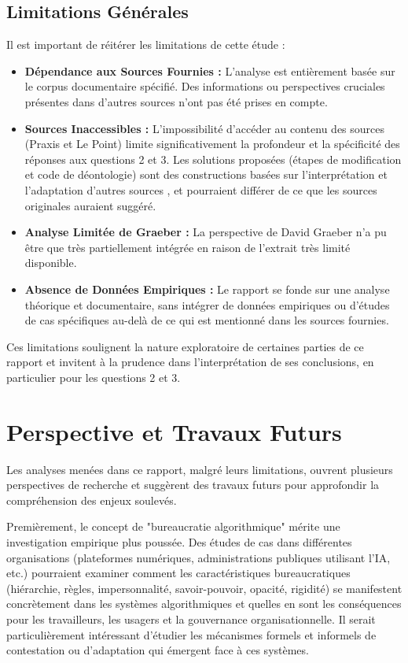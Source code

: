 \documentclass[10pt, twocolumn]{article}
\begin{document}
\subsection{Limitations Générales}

Il est important de réitérer les limitations de cette étude :
\begin{itemize}
    \item \textbf{Dépendance aux Sources Fournies :} L'analyse est entièrement basée sur le corpus documentaire spécifié. Des informations ou perspectives cruciales présentes dans d'autres sources n'ont pas été prises en compte.
    \item \textbf{Sources Inaccessibles :} L'impossibilité d'accéder au contenu des sources (Praxis et Le Point) limite significativement la profondeur et la spécificité des réponses aux questions 2 et 3. Les solutions proposées (étapes de modification et code de déontologie) sont des constructions basées sur l'interprétation et l'adaptation d'autres sources \citep{Montreal2018, Biosphere2015}, et pourraient différer de ce que les sources originales auraient suggéré.
    \item \textbf{Analyse Limitée de Graeber :} La perspective de David Graeber \citep{Graeber2015} n'a pu être que très partiellement intégrée en raison de l'extrait très limité disponible.
    \item \textbf{Absence de Données Empiriques :} Le rapport se fonde sur une analyse théorique et documentaire, sans intégrer de données empiriques ou d'études de cas spécifiques au-delà de ce qui est mentionné dans les sources fournies.
\end{itemize}
Ces limitations soulignent la nature exploratoire de certaines parties de ce rapport et invitent à la prudence dans l'interprétation de ses conclusions, en particulier pour les questions 2 et 3.

\section{Perspective et Travaux Futurs}

Les analyses menées dans ce rapport, malgré leurs limitations, ouvrent plusieurs perspectives de recherche et suggèrent des travaux futurs pour approfondir la compréhension des enjeux soulevés.

Premièrement, le concept de "bureaucratie algorithmique" mérite une investigation empirique plus poussée. Des études de cas dans différentes organisations (plateformes numériques, administrations publiques utilisant l'IA, etc.) pourraient examiner comment les caractéristiques bureaucratiques (hiérarchie, règles, impersonnalité, savoir-pouvoir, opacité, rigidité) se manifestent concrètement dans les systèmes algorithmiques et quelles en sont les conséquences pour les travailleurs, les usagers et la gouvernance organisationnelle. Il serait particulièrement intéressant d'étudier les mécanismes formels et informels de contestation ou d'adaptation qui émergent face à ces systèmes.
\end{document}
